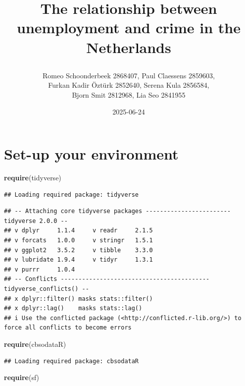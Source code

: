 \documentclass[
]{article}
\title{\vspace{-2em}

The relationship between unemployment and crime in the Netherlands}
\author{Romeo Schoonderbeek 2868407, Paul Claessens 2859603,\\
Furkan Kadir Öztürk 2852640, Serena Kula 2856584,\\
Bjorn Smit 2812968, Lia Seo 2841955}
\date{2025-06-24}
\newenvironment{Shaded}{\begin{snugshade}}{\end{snugshade}}
\newcommand{\FunctionTok}[1]{\textcolor[rgb]{0.13,0.29,0.53}{\textbf{#1}}}
\newcommand{\NormalTok}[1]{#1}
\begin{document}
\maketitle

\fontsize{8}{12}\selectfont  
\setlength{\parskip}{0.5em}
\setlength{\headsep}{0.5em}

\section{Set-up your environment}\label{set-up-your-environment}

\begin{Shaded}
\begin{Highlighting}[]
\FunctionTok{require}\NormalTok{(tidyverse)}
\end{Highlighting}
\end{Shaded}

\begin{verbatim}
## Loading required package: tidyverse
\end{verbatim}

\begin{verbatim}
## -- Attaching core tidyverse packages ------------------------ tidyverse 2.0.0 --
## v dplyr     1.1.4     v readr     2.1.5
## v forcats   1.0.0     v stringr   1.5.1
## v ggplot2   3.5.2     v tibble    3.3.0
## v lubridate 1.9.4     v tidyr     1.3.1
## v purrr     1.0.4     
## -- Conflicts ------------------------------------------ tidyverse_conflicts() --
## x dplyr::filter() masks stats::filter()
## x dplyr::lag()    masks stats::lag()
## i Use the conflicted package (<http://conflicted.r-lib.org/>) to force all conflicts to become errors
\end{verbatim}

\begin{Shaded}
\begin{Highlighting}[]
\FunctionTok{require}\NormalTok{(cbsodataR)}
\end{Highlighting}
\end{Shaded}

\begin{verbatim}
## Loading required package: cbsodataR
\end{verbatim}

\begin{Shaded}
\begin{Highlighting}[]
\FunctionTok{require}\NormalTok{(sf)}
\end{Highlighting}
\end{Shaded}
\end{document}
